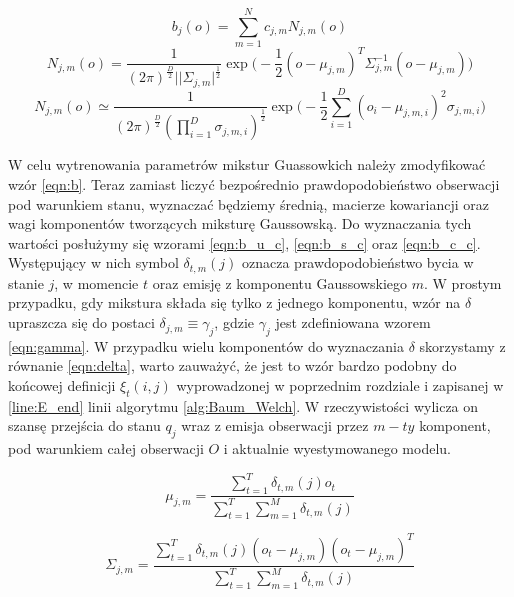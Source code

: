 \documentclass[shortabstract, mgr]{iithesis}
\begin{document}
	   \begin{equation}
		   	b_j(o) = \sum_{m=1}^N c_{j,m} N_{j,m}(o)
		   	\label{eqn:GMM}
	   \end{equation}
	   \begin{equation}
		   N_{j,m}(o)=\frac{1}{(2\pi)^{\frac{D}{2}}||\Sigma_{j,m}|^{\frac{1}{2}}}\exp\bigg( -\frac{1}{2}(o-\mu_{j,m})^T\Sigma_{j,m}^{-1}(o-\mu_{j,m}) \bigg)
		   \label{eqn:normal_distribution}
	   \end{equation}	
	   \begin{equation}
		   N_{j,m}(o)\simeq\frac{1}{(2\pi)^{\frac{D}{2}}(\prod_{i=1}^D\sigma_{j,m,i})^{\frac{1}{2}}}\exp\bigg( -\frac{1}{2}\sum_{i=1}^D(o_i-\mu_{j,m,i})^2\sigma_{j,m,i} \bigg)
	   \label{eqn:normal_distribution_simple}
	   \end{equation}
	   
	   W celu wytrenowania parametrów mikstur Guassowkich należy zmodyfikować wzór \ref{eqn:b}. Teraz zamiast liczyć bezpośrednio prawdopodobieństwo obserwacji pod warunkiem stanu, wyznaczać będziemy średnią, macierze kowariancji oraz wagi komponentów tworzących miksturę Gaussowską. Do wyznaczania tych wartości posłużymy się wzorami \ref{eqn:b_u_c}, \ref{eqn:b_s_c} oraz \ref{eqn:b_c_c}. Występujący w nich symbol $\delta_{t,m}(j)$ oznacza prawdopodobieństwo bycia w stanie $j$, w momencie $t$ oraz emisję z komponentu Gaussowskiego $m$. W prostym przypadku, gdy mikstura składa się tylko z jednego komponentu, wzór na $\delta$ upraszcza się do postaci $\delta_{j,m} \equiv \gamma_j$, gdzie $\gamma_j$ jest zdefiniowana wzorem \ref{eqn:gamma}. W przypadku wielu komponentów do wyznaczania $\delta$ skorzystamy z równanie \ref{eqn:delta}, warto zauważyć, że jest to wzór bardzo podobny do końcowej definicji $\xi _t(i,j)$ wyprowadzonej w poprzednim rozdziale i zapisanej w \ref{line:E_end} linii algorytmu \ref{alg:Baum_Welch}. W rzeczywistości wylicza on szansę przejścia do stanu $q_j$ wraz z emisja obserwacji przez $m-ty$ komponent, pod warunkiem całej obserwacji $O$ i aktualnie wyestymowanego modelu.
	   
	   \begin{equation}
	   \mu_{j,m}=\frac{\sum_{t=1}^T\delta_{t,m}(j)o_t}{\sum_{t=1}^T\sum_{m=1}^M\delta_{t,m}(j)}
	   \label{eqn:b_u_c}
	   \end{equation}
	   
	   \begin{equation}
	   \Sigma_{j,m}=\frac{\sum_{t=1}^T\delta_{t,m}(j)(o_t-\mu_{j,m})(o_t-\mu_{j,m})^T}{\sum_{t=1}^T\sum_{m=1}^M\delta_{t,m}(j)}
	   \label{eqn:b_s_c}
	   \end{equation}
	   
\end{document}
